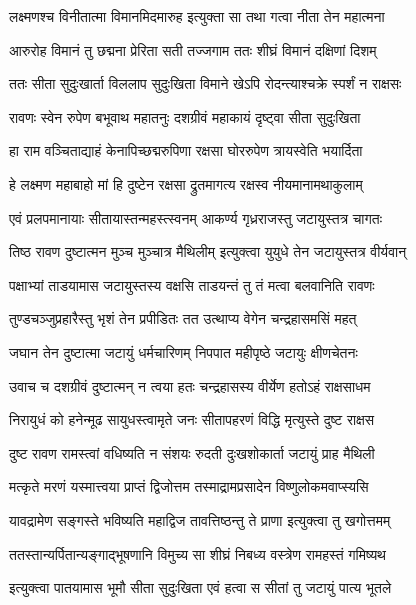 \twolineshloka
{लक्ष्मणश्च विनीतात्मा विमानमिदमारुह}
{इत्युक्ता सा तथा गत्वा नीता तेन महात्मना} %

\twolineshloka
{आरुरोह विमानं तु छद्मना प्रेरिता सती}
{तज्जगाम ततः शीघ्रं विमानं दक्षिणां दिशम्} %

\twolineshloka
{ततः सीता सुदुःखार्ता विललाप सुदुःखिता}
{विमाने खेऽपि रोदन्त्याश्चक्रे स्पर्शं न राक्षसः} %

\twolineshloka
{रावणः स्वेन रुपेण बभूवाथ महातनुः}
{दशग्रीवं महाकायं दृष्ट्वा सीता सुदुःखिता} %

\twolineshloka
{हा राम वञ्चिताद्याहं केनापिच्छद्मरुपिणा}
{रक्षसा घोररुपेण त्रायस्वेति भयार्दिता} %

\twolineshloka
{हे लक्ष्मण महाबाहो मां हि दुष्टेन रक्षसा}
{द्रुतमागत्य रक्षस्व नीयमानामथाकुलाम्} %

\twolineshloka
{एवं प्रलपमानायाः सीतायास्तन्महस्त्स्वनम्}
{आकर्ण्य गृध्रराजस्तु जटायुस्तत्र चागतः} %

\twolineshloka
{तिष्ठ रावण दुष्टात्मन मुञ्च मुञ्चात्र मैथिलीम्}
{इत्युक्त्वा युयुधे तेन जटायुस्तत्र वीर्यवान्} %

\twolineshloka
{पक्षाभ्यां ताडयामास जटायुस्तस्य वक्षसि}
{ताडयन्तं तु तं मत्वा बलवानिति रावणः} %

\twolineshloka
{तुण्डचञ्जुप्रहारैस्तु भृशं तेन प्रपीडितः}
{तत उत्थाप्य वेगेन चन्द्रहासमसिं महत्} %

\twolineshloka
{जघान तेन दुष्टात्मा जटायुं धर्मचारिणम्}
{निपपात महीपृष्ठे जटायुः क्षीणचेतनः} %

\twolineshloka
{उवाच च दशग्रीवं दुष्टात्मन् न त्वया हतः}
{चन्द्रहासस्य वीर्येण हतोऽहं राक्षसाधम} %

\twolineshloka
{निरायुधं को हनेन्मूढ सायुधस्त्वामृते जनः}
{सीतापहरणं विद्धि मृत्युस्ते दुष्ट राक्षस} %

\twolineshloka
{दुष्ट रावण रामस्त्वां वधिष्यति न संशयः}
{रुदती दुःखशोकार्ता जटायुं प्राह मैथिली} %

\twolineshloka
{मत्कृते मरणं यस्मात्त्वया प्राप्तं द्विजोत्तम}
{तस्माद्रामप्रसादेन विष्णुलोकमवाप्स्यसि} %

\twolineshloka
{यावद्रामेण सङ्गस्ते भविष्यति महाद्विज}
{तावत्तिष्ठन्तु ते प्राणा इत्युक्त्वा तु खगोत्तमम्} %

\twolineshloka
{ततस्तान्यर्पितान्यङ्गाद्भूषणानि विमुच्य सा}
{शीघ्रं निबध्य वस्त्रेण रामहस्तं गमिष्यथ} %

\twolineshloka
{इत्युक्त्वा पातयामास भूमौ सीता सुदुःखिता}
{एवं हत्वा स सीतां तु जटायुं पात्य भूतले} %

